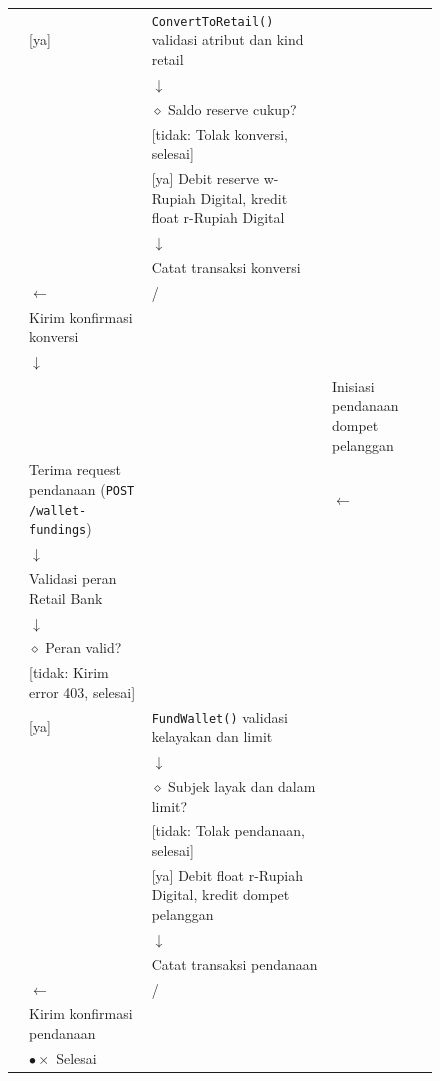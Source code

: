 \documentclass[12pt,a4paper]{article}
\begin{document}
\begin{figure}[H]
\begin{tabular}{@{}p{2.4cm}|p{3cm}|p{3cm}|p{3cm}@{}}
& [ya] & \texttt{ConvertToRetail()} validasi atribut dan kind retail & \\
& & $\downarrow$ & \\
& & $\diamond$ Saldo reserve cukup? & \\
& & [tidak: Tolak konversi, selesai] & \\
& & [ya] Debit reserve w-Rupiah Digital, kredit float r-Rupiah Digital & \\
& & $\downarrow$ & \\
& & Catat transaksi konversi & \\
& $\leftarrow$ & / & \\
& Kirim konfirmasi konversi & & \\
& $\downarrow$ & & \\
& & & Inisiasi pendanaan dompet pelanggan \\
& Terima request pendanaan (\texttt{POST /wallet-fundings}) & & $\leftarrow$ \\
& $\downarrow$ & & \\
& Validasi peran Retail Bank & & \\
& $\downarrow$ & & \\
& $\diamond$ Peran valid? & & \\
& [tidak: Kirim error 403, selesai] & & \\
& [ya] & \texttt{FundWallet()} validasi kelayakan dan limit & \\
& & $\downarrow$ & \\
& & $\diamond$ Subjek layak dan dalam limit? & \\
& & [tidak: Tolak pendanaan, selesai] & \\
& & [ya] Debit float r-Rupiah Digital, kredit dompet pelanggan & \\
& & $\downarrow$ & \\
& & Catat transaksi pendanaan & \\
& $\leftarrow$ & / & \\
& Kirim konfirmasi pendanaan & & \\
& $\bullet\times$ Selesai & & \\
\end{tabular}
\end{figure}
\end{document}
